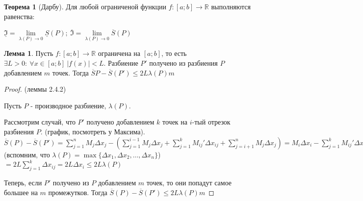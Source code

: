 \documentclass{report}
\theoremstyle{definition}
\newtheorem{lemma}{Лемма}[section]
\newtheorem{theorem}{Теорема}[section]
\begin{document}
\begin{theorem}[Дарбу]
  Для любой ограниченой функции $f:[a;b]\rightarrow\mathbb{R}$ выполняются равенства:

  \begin{center}
    {\large $\underline{\mathfrak{I}} = \underset{\lambda(P)\rightarrow0}{\lim}\underline{S}(P); \ \overline{\mathfrak{I}}
        = \underset{\lambda(P)\rightarrow0}{\lim}\overline{S}(P)$}
  \end{center}
\end{theorem}

\begin{lemma}
  Пусть $f:[a;b]\rightarrow\mathbb{R}$ ограничена на $[a;b]$, то есть $\exists L > 0: \ \forall x \in [a;b]
    \ | f(x) | < L$. Разбиение $P'$ получено из разбиения $P$ добавлением $m$ точек. Тогда $\overline{S}{P}
    - \overline{S}(P') \leqslant 2L\lambda(P)m$
\end{lemma}

\begin{proof}
  (леммы 2.4.2)

  Пусть $P$ - производное разбиение, $\lambda(P)$.

  Рассмотрим случай, что $P'$ получено добавлением $k$ точек на $i$-тый отрезок разбиения $P$. (график,
  посмотреть у Максима). $\overline{S}(P) - \overline{S}(P') = \sum_{j=1}^{n}M_{j}\Delta x_{j} -
    (\sum_{j=1}^{i-1}M_{j}\Delta x_{j} + \sum_{j = 1}^{k}M_{ij}'\Delta x_{ij} + \sum_{j=i+1}^{n}
    M_{j}\Delta x_{j}) = M_{i}\Delta x_{i} - \sum_{j = 1}^{k}M_{ij}'\Delta x_{ij} = M_{i}\sum_{j=1}^{k}
    \Delta x_{ij} - \sum_{j=1}^{k}M_{ij}'\Delta x_{ij} = \sum_{j=1}^{k}M_{i}\Delta x_{ij} - \sum_{j=1}^{k}
    M_{ij}'\Delta x_{ij} = \sum_{j=1}^{k}(M_{i} - M_{ij}')\Delta x_{ij} \leqslant \sum_{j=1}^{k}2L\Delta x_{ij}
    =$ (вспомним, что $\lambda(P)=\max\{\Delta x_{1},\Delta x_{2},\ldots,\Delta x_{n}\}$) $=2L\sum_{j=1}^{k}
    \Delta x_{ij} = 2L\Delta x_{i} \leqslant 2L\lambda(P)$

  Теперь, если $P'$ получено из $P$ добавлением $m$ точек, то они попадут самое большее на $m$ промежутков.
  Тогда $\overline{S}(P) - \overline{S}(P') \leqslant 2L\lambda (P)m$
\end{proof}
\end{document}
